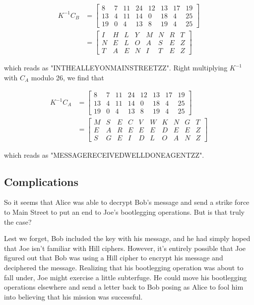 \documentclass{paper}
\begin{document}
\begin{equation*}
    \begin{split}
        K^{-1}C_B & = \begin{bmatrix}8 & 7 & 11 & 24 & 12 & 13 & 17 & 19 \\ 13 & 4 & 11 & 14 & 0 & 18 & 4 & 25\\ 19 & 0 & 4 & 13 & 8 & 19 & 4 & 25\end{bmatrix} \\
        & = \begin{bmatrix}I & H & L & Y & M & N & R & T \\ N & E & L & O & A & S & E & Z \\ T & A & E & N & I & T & E & Z\end{bmatrix}
    \end{split}
\end{equation*}

which reads as "INTHEALLEYONMAINSTREETZZ". Right multiplying $K^{-1}$ with $C_A$ modulo 26, we find that

\begin{equation*}
    \begin{split}
        K^{-1}C_A & = \begin{bmatrix}8 & 7 & 11 & 24 & 12 & 13 & 17 & 19 \\ 13 & 4 & 11 & 14 & 0 & 18 & 4 & 25\\ 19 & 0 & 4 & 13 & 8 & 19 & 4 & 25\end{bmatrix} \\
        & = \begin{bmatrix}M & S & E & C & V & W & K & N & G & T \\ E & A & R & E & E & E &D & E & E & Z \\ S & G & E & I & D & L & O & A & N & Z\end{bmatrix}
    \end{split}
\end{equation*}

which reads as "MESSAGERECEIVEDWELLDONEAGENTZZ". 

\subsection{Complications}

So it seems that Alice was able to decrypt Bob's message and send a strike force to Main Street to put an end to Joe's bootlegging operations. But is that truly the case?

\medskip
Lest we forget, Bob included the key with his message, and he had simply hoped that Joe isn't familiar with Hill ciphers. However, it's entirely possible that Joe figured out that Bob was using a Hill cipher to encrypt his message and deciphered the message. Realizing that his bootlegging operation was about to fall under, Joe might exercise a little subterfuge. He could move his bootlegging operations elsewhere and send a letter back to Bob posing as Alice to fool him into believing that his mission was successful. 
\end{document}
